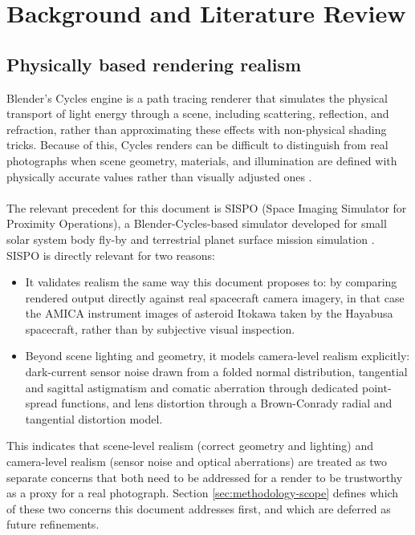 \chapter{Background and Literature Review}
\label{chap:background}

\section{Physically based rendering realism}

Blender's Cycles engine is a path tracing renderer that simulates the physical transport of light energy through a scene, including scattering, reflection, and refraction, rather than approximating these effects with non-physical shading tricks. Because of this, Cycles renders can be difficult to distinguish from real photographs when scene geometry, materials, and illumination are defined with physically accurate values rather than visually adjusted ones \cite{blendergrid_physical_brightness}.
\\\\
The relevant precedent for this document is SISPO (Space Imaging Simulator for Proximity Operations), a Blender-Cycles-based simulator developed for small solar system body fly-by and terrestrial planet surface mission simulation \cite{sispo2022}. SISPO is directly relevant for two reasons:

\begin{itemize}
    \item It validates realism the same way this document proposes to: by comparing rendered output directly against real spacecraft camera imagery, in that case the AMICA instrument images of asteroid Itokawa taken by the Hayabusa spacecraft, rather than by subjective visual inspection.
    \item Beyond scene lighting and geometry, it models camera-level realism explicitly: dark-current sensor noise drawn from a folded normal distribution, tangential and sagittal astigmatism and comatic aberration through dedicated point-spread functions, and lens distortion through a Brown-Conrady radial and tangential distortion model.
\end{itemize}

This indicates that scene-level realism (correct geometry and lighting) and camera-level realism (sensor noise and optical aberrations) are treated as two separate concerns that both need to be addressed for a render to be trustworthy as a proxy for a real photograph. Section \ref{sec:methodology-scope} defines which of these two concerns this document addresses first, and which are deferred as future refinements.

